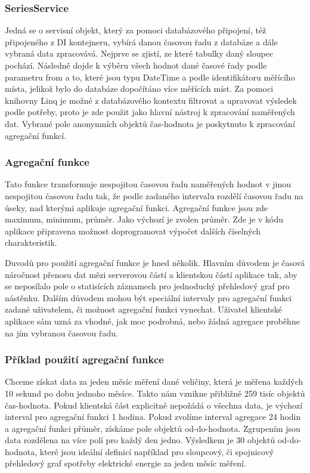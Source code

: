 \documentclass[FM,BP]{tulthesis}
\begin{document}
        \subsubsection{SeriesService}
            Jedná se o servisní objekt, který za pomoci databázového připojení, též připojeného z DI kontejneru, vybírá danou časovou řadu z databáze a dále vybraná data zpracovává.
            Nejprve se zjistí, ze které tabulky daný sloupec pochází. 
            Následně dojde k výběru všech hodnot dané časové řady podle parametru from a to, které jsou typu DateTime a podle identifikátoru měřícího místa, 
            jelikož bylo do databáze dopočítáno více měřících míst.
            Za pomoci knihovny Linq je možné z databázového kontextu filtrovat a upravovat výsledek podle potřeby,
            proto je zde použit jako hlavní nástroj k zpracování naměřených dat.
            Vybrané pole anonymních objektů čas-hodnota je poskytnuto k zpracování agregační funkcí. 

            \subsubsection{Agregační funkce}
                Tato funkce transformuje nespojitou časovou řadu naměřených hodnot v jinou nespojitou časovou řadu tak, 
                že podle zadaného intervalu rozdělí časovou řadu na úseky, 
                nad kterými aplikuje agregační funkci. 
                Agregační funkce jsou zde maximum, minimum, průměr. Jako výchozí je zvolen průměr. 
                Zde je v kódu aplikace připravena možnost doprogramovat výpočet dalších číselných charakteristik.

                Duvodů pro použití agregační funkce je hned několik. Hlavním důvodem je časová náročnost přenosu dat mězi serverovou částí 
                a klientskou částí aplikace tak, aby se neposílalo pole o statisících záznamech pro jednoduchý přehledový graf pro nástěnku.
                Dalším důvodem mohou být speciální intervaly pro agregační funkci zadané uživatelem, či možnost agregační funkci vynechat.
                Uživatel klientské aplikace sám uzná za vhodné, jak moc podrobná, nebo žádná agregace proběhne na jím vybranou časovou řadu.

            \subsubsection{Příklad použití agregační funkce}
                Chceme získat data za jeden měsíc měření dané veličiny, která je měřena každých 10 sekund po dobu jednoho měsíce. 
                Takto nám vznikne přibližně 259 tisíc objektů čas-hodnota.
                Pokud klientská část explicitně nepožádá o všechna data, je výchozí interval pro agregační funkci 1 hodina. 
                Pokud zvolíme interval agregace 24 hodin a agregační funkci přůměr, získáme pole objektů od-do-hodnota. 
                Zgrupením jsou data rozdělena na více polí pro každý den jedno. 
                Výsledkem je 30 objektů od-do-hodnota, které jsou ideální definicí například pro sloupcový, 
                či spojnicový přehledový graf spotřeby elektrické energie za jeden měsíc měření.
\end{document}

